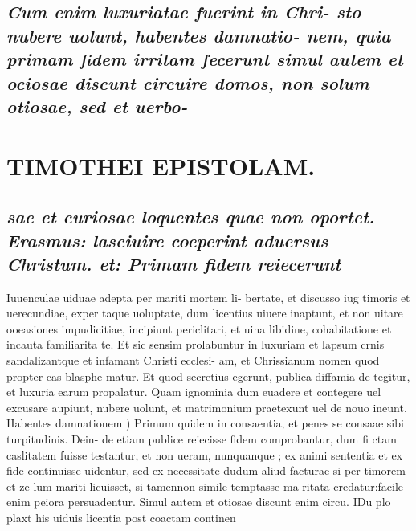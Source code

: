 \documentclass{article}
\begin{document}
\begin{pages}
\subsection*{\textit{Cum enim luxuriatae fuerint in Chri- sto nubere uolunt, habentes damnatio- nem, quia primam fidem irritam fecerunt simul autem et ociosae discunt circuire domos, non solum otiosae, sed et uerbo- }}
\section*{TIMOTHEI EPISTOLAM. }
\marginpar{[ p.131 ]}
{}
\subsection*{\textit{sae et curiosae loquentes quae non oportet. Erasmus: lasciuire coeperint aduersus Christum. et: Primam fidem reiecerunt }}\pstart Iuuenculae uiduae adepta per mariti mortem li- bertate, et discusso iug timoris et uerecundiae, exper taque uoluptate, dum licentius uiuere inaptunt, et non uitare ooeasiones impudicitiae, incipiunt periclitari, et uina libidine, cohabitatione et incauta familiarita te. Et sic sensim prolabuntur in luxuriam et lapsum crnis sandalizantque et infamant Christi ecclesi- am, et Chrissianum nomen quod propter cas blasphe matur. Et quod secretius egerunt, publica diffamia de tegitur, et luxuria earum propalatur. Quam ignominia dum euadere et contegere uel excusare aupiunt, nubere uolunt, et matrimonium praetexunt uel de nouo ineunt.  \pend\pstart Habentes damnationem ) Primum quidem in consaentia, et penes se consaae sibi turpitudinis. Dein- de etiam publice reiecisse fidem comprobantur, dum fi ctam caslitatem fuisse testantur, et non ueram, nunquanque ; ex animi sententia et ex fide continuisse uidentur, sed ex necessitate dudum aliud facturae si per timorem et ze lum mariti licuisset, si tamennon simile temptasse ma ritata credatur:facile enim peiora persuadentur.  \pend\pstart Simul autem et otiosae discunt enim circu. IDu plo plaxt his uiduis licentia post coactam continen  \pend

\end{pages}
\end{document}
